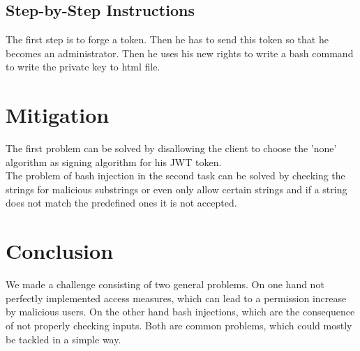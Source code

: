 \documentclass[12pt,a4paper]{article}
\begin{document}
\subsection{Step-by-Step Instructions}
The first step is to forge a token. Then he has to send this token so that he becomes an administrator. Then he uses his new rights to write a bash command to write the private key to html file.
\section{Mitigation}

The first problem can be solved by disallowing the client to choose the 'none' algorithm as signing algorithm for his JWT token.
\\
The problem of bash injection in the second task can be solved by checking the strings for malicious substrings or even only allow certain strings and if a string does not match the predefined ones it is not accepted.

\section{Conclusion}
We made a challenge consisting of two general problems. On one hand not perfectly implemented access measures, which can lead to a permission increase by malicious users. On the other hand bash injections, which are the consequence of not properly checking inputs. Both are common problems, which could mostly be tackled in a simple way.
\end{document}
